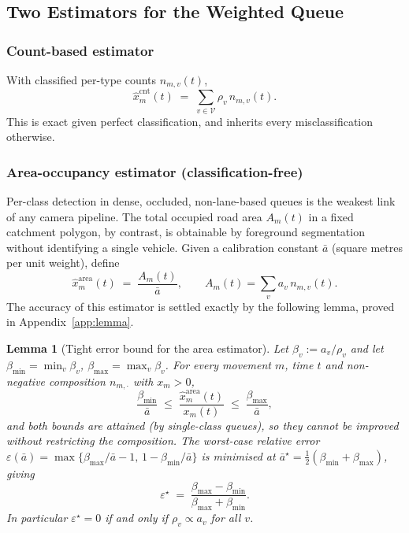 \documentclass[journal]{IEEEtran}
\newtheorem{lemma}{Lemma}
\newcommand{\vc}{\mathcal{V}}
\begin{document}
\subsection{Two Estimators for the Weighted Queue}
\label{subsec:estimators}

\subsubsection{Count-based estimator} With classified per-type counts
$n_{m,v}(t)$,
\begin{equation}
\hat{x}^{\mathrm{cnt}}_m(t) \;=\; \sum_{v\in\vc} \rho_v\, n_{m,v}(t).
\label{eq:count_est}
\end{equation}
This is exact given perfect classification, and inherits every
misclassification otherwise.

\subsubsection{Area-occupancy estimator (classification-free)} Per-class
detection in dense, occluded, non-lane-based queues is the weakest link
of any camera pipeline. The total occupied road area $A_m(t)$ in a fixed
catchment polygon, by contrast, is obtainable by foreground segmentation
without identifying a single vehicle. Given a calibration constant
$\bar a$ (square metres per unit weight), define
\begin{equation}
\hat{x}^{\mathrm{area}}_m(t) \;=\; \frac{A_m(t)}{\bar a},
\qquad
A_m(t) = \sum_{v} a_v\, n_{m,v}(t).
\label{eq:area_est}
\end{equation}
The accuracy of this estimator is settled exactly by the following
lemma, proved in Appendix~\ref{app:lemma}.

\begin{lemma}[Tight error bound for the area estimator]
\label{lem:area}
Let $\beta_v := a_v/\rho_v$ and let
$\beta_{\min}=\min_v \beta_v$, $\beta_{\max}=\max_v \beta_v$. For every
movement $m$, time $t$ and non-negative composition $n_{m,\cdot}$ with
$x_m>0$,
\begin{equation}
\frac{\beta_{\min}}{\bar a}
\;\le\; \frac{\hat{x}^{\mathrm{area}}_m(t)}{x_m(t)}
\;\le\; \frac{\beta_{\max}}{\bar a},
\label{eq:lem_bound}
\end{equation}
and both bounds are attained (by single-class queues), so they cannot be
improved without restricting the composition. The worst-case relative
error $\varepsilon(\bar a)=\max\{\beta_{\max}/\bar a - 1,\,
1 - \beta_{\min}/\bar a\}$ is minimised at
$\bar a^\star=\tfrac12(\beta_{\min}+\beta_{\max})$, giving
\begin{equation}
\varepsilon^\star \;=\;
\frac{\beta_{\max}-\beta_{\min}}{\beta_{\max}+\beta_{\min}}.
\label{eq:epsstar}
\end{equation}
In particular $\varepsilon^\star = 0$ if and only if $\rho_v \propto a_v$
for all $v$.
\end{lemma}
\end{document}
